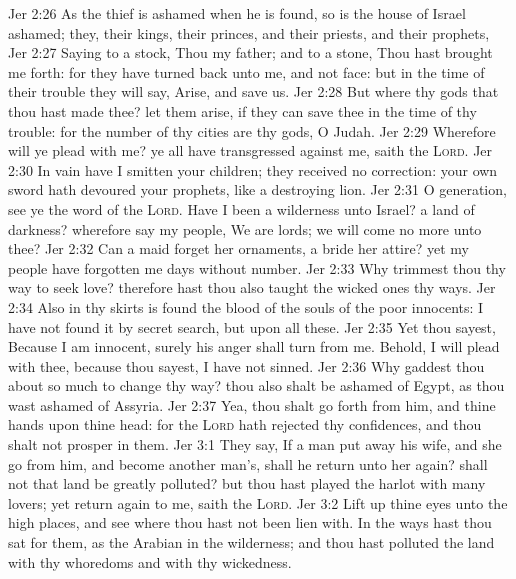 \vs Jer 2:26 As the thief is ashamed when he is found, so is the house of Israel ashamed; they, their kings, their princes, and their priests, and their prophets,
\vs Jer 2:27 Saying to a stock, Thou  my father; and to a stone, Thou hast brought me forth: for they have turned  back unto me, and not  face: but in the time of their trouble they will say, Arise, and save us.
\vs Jer 2:28 But where  thy gods that thou hast made thee? let them arise, if they can save thee in the time of thy trouble: for  the number of thy cities are thy gods, O Judah.
\vs Jer 2:29 Wherefore will ye plead with me? ye all have transgressed against me, saith the \textsc{Lord}.
\vs Jer 2:30 In vain have I smitten your children; they received no correction: your own sword hath devoured your prophets, like a destroying lion.
\vs Jer 2:31 O generation, see ye the word of the \textsc{Lord}. Have I been a wilderness unto Israel? a land of darkness? wherefore say my people, We are lords; we will come no more unto thee?
\vs Jer 2:32 Can a maid forget her ornaments,  a bride her attire? yet my people have forgotten me days without number.
\vs Jer 2:33 Why trimmest thou thy way to seek love? therefore hast thou also taught the wicked ones thy ways.
\vs Jer 2:34 Also in thy skirts is found the blood of the souls of the poor innocents: I have not found it by secret search, but upon all these.
\vs Jer 2:35 Yet thou sayest, Because I am innocent, surely his anger shall turn from me. Behold, I will plead with thee, because thou sayest, I have not sinned.
\vs Jer 2:36 Why gaddest thou about so much to change thy way? thou also shalt be ashamed of Egypt, as thou wast ashamed of Assyria.
\vs Jer 2:37 Yea, thou shalt go forth from him, and thine hands upon thine head: for the \textsc{Lord} hath rejected thy confidences, and thou shalt not prosper in them.
\vs Jer 3:1 They say, If a man put away his wife, and she go from him, and become another man's, shall he return unto her again? shall not that land be greatly polluted? but thou hast played the harlot with many lovers; yet return again to me, saith the \textsc{Lord}.
\vs Jer 3:2 Lift up thine eyes unto the high places, and see where thou hast not been lien with. In the ways hast thou sat for them, as the Arabian in the wilderness; and thou hast polluted the land with thy whoredoms and with thy wickedness.
